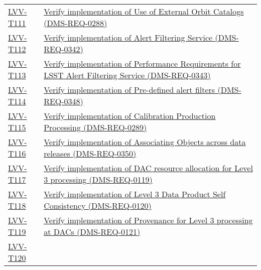 \begin{longtable}[]{p{3cm}p{13cm}}
\protect\hyperlink{lvv-t111---verify-implementation-of-use-of-external-orbit-catalogs-dms-req-0288}{LVV-T111}
&
\href{https://jira.lsstcorp.org/secure/Tests.jspa\#/testCase/LVV-T111}{Verify
implementation of Use of External Orbit Catalogs
(DMS-REQ-0288)}\tabularnewline
\protect\hyperlink{lvv-t112---verify-implementation-of-alert-filtering-service-dms-req-0342}{LVV-T112}
&
\href{https://jira.lsstcorp.org/secure/Tests.jspa\#/testCase/LVV-T112}{Verify
implementation of Alert Filtering Service (DMS-REQ-0342)}\tabularnewline
\protect\hyperlink{lvv-t113---verify-implementation-of-performance-requirements-for-lsst-alert-filtering-service--dms-req-0343}{LVV-T113}
&
\href{https://jira.lsstcorp.org/secure/Tests.jspa\#/testCase/LVV-T113}{Verify
implementation of Performance Requirements for LSST Alert Filtering
Service (DMS-REQ-0343)}\tabularnewline
\protect\hyperlink{lvv-t114---verify-implementation-of-pre-defined-alert-filters-dms-req-0348}{LVV-T114}
&
\href{https://jira.lsstcorp.org/secure/Tests.jspa\#/testCase/LVV-T114}{Verify
implementation of Pre-defined alert filters
(DMS-REQ-0348)}\tabularnewline
\protect\hyperlink{lvv-t115---verify-implementation-of-calibration-production-processing-dms-req-0289}{LVV-T115}
&
\href{https://jira.lsstcorp.org/secure/Tests.jspa\#/testCase/LVV-T115}{Verify
implementation of Calibration Production Processing
(DMS-REQ-0289)}\tabularnewline
\protect\hyperlink{lvv-t116---verify-implementation-of-associating-objects-across-data-releases-dms-req-0350}{LVV-T116}
&
\href{https://jira.lsstcorp.org/secure/Tests.jspa\#/testCase/LVV-T116}{Verify
implementation of Associating Objects across data releases
(DMS-REQ-0350)}\tabularnewline
\protect\hyperlink{lvv-t117---verify-implementation-of--dac-resource-allocation-for-level-3-processing-dms-req-0119}{LVV-T117}
&
\href{https://jira.lsstcorp.org/secure/Tests.jspa\#/testCase/LVV-T117}{Verify
implementation of DAC resource allocation for Level 3 processing
(DMS-REQ-0119)}\tabularnewline
\protect\hyperlink{lvv-t118---verify-implementation-of-level-3-data-product-self-consistency-dms-req-0120}{LVV-T118}
&
\href{https://jira.lsstcorp.org/secure/Tests.jspa\#/testCase/LVV-T118}{Verify
implementation of Level 3 Data Product Self Consistency
(DMS-REQ-0120)}\tabularnewline
\protect\hyperlink{lvv-t119---verify-implementation-of-provenance-for-level-3-processing-at-dacs-dms-req-0121}{LVV-T119}
&
\href{https://jira.lsstcorp.org/secure/Tests.jspa\#/testCase/LVV-T119}{Verify
implementation of Provenance for Level 3 processing at DACs
(DMS-REQ-0121)}\tabularnewline
\protect\hyperlink{lvv-t120---verify-implementation-of-software-framework-for-level-3-catalog-processing-dms-req-0125}{LVV-T120}

\end{longtable}
